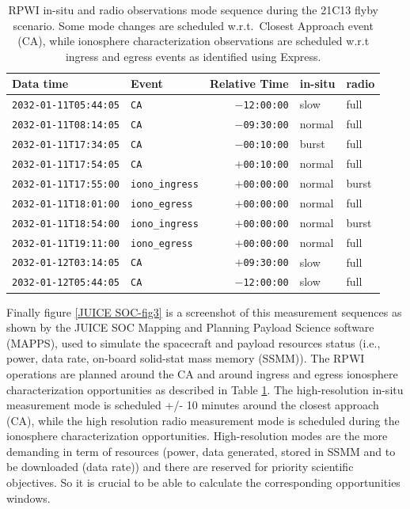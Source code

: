 \documentclass[referee]{aa}
\begin{document}
\begin{table}[]
    \centering
    \begin{tabular}{l|l|r|l|l}
Data time                   & Event	    & Relative Time      & in-situ&radio\\ \hline
\texttt{2032-01-11T05:44:05}&\texttt{CA}&\texttt{$-$12:00:00}& slow	  &full\\
\texttt{2032-01-11T08:14:05}&\texttt{CA}&\texttt{$-$09:30:00}& normal &full\\
\texttt{2032-01-11T17:34:05}&\texttt{CA}&\texttt{$-$00:10:00}& burst  &full\\
\texttt{2032-01-11T17:54:05}&\texttt{CA}&\texttt{$+$00:10:00}  & normal &full\\
\texttt{2032-01-11T17:55:00}&\texttt{iono\_ingress}&\texttt{$+$00:00:00}&normal & burst\\
\texttt{2032-01-11T18:01:00}&\texttt{iono\_egress} &\texttt{$+$00:00:00}&normal & full\\
\texttt{2032-01-11T18:54:00}&\texttt{iono\_ingress}&\texttt{$+$00:00:00}&normal & burst\\
\texttt{2032-01-11T19:11:00}&\texttt{iono\_egress} &\texttt{$+$00:00:00}&normal & full\\
\texttt{2032-01-12T03:14:05}&\texttt{CA}&\texttt{$+$09:30:00}  & slow   &full\\
\texttt{2032-01-12T05:44:05}&\texttt{CA}&\texttt{$-$12:00:00}& slow   &full
    \end{tabular}
    \caption{RPWI in-situ and radio observations mode sequence during the 21C13  flyby scenario. Some mode changes are scheduled w.r.t.\ Closest Approach event (CA), while ionosphere characterization observations are scheduled w.r.t ingress and egress events as identified using Express.}
    \label{JUICE SOC-tab1}
\end{table}

Finally figure \ref{JUICE SOC-fig3} is a screenshot of this measurement sequences as shown by the JUICE SOC Mapping and Planning Payload Science software (MAPPS), used to simulate the spacecraft and payload resources status (i.e., power, data rate, on-board solid-stat mass memory (SSMM)). The RPWI operations are planned around the CA and around ingress and egress ionosphere characterization opportunities as described in Table \ref{JUICE SOC-tab1}. The high-resolution in-situ measurement mode is scheduled +/- 10 minutes around the closest approach (CA), while the high resolution radio measurement mode is scheduled during the ionosphere characterization opportunities. High-resolution modes are the more demanding in term of resources (power, data generated, stored in SSMM and to be downloaded (data rate)) and there are reserved for priority scientific objectives. So it is crucial to be able to calculate the corresponding opportunities windows.
\end{document}
